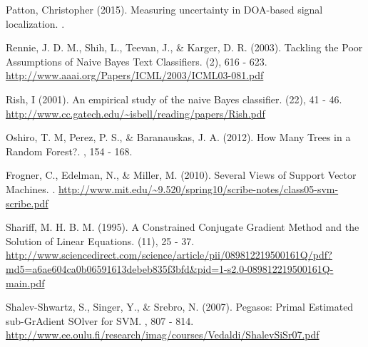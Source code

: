 \documentclass[twoside]{article}
\begin{document}
\begin{thebibliography}{99} %

Patton, Christopher (2015).
\newblock Measuring uncertainty in DOA-based signal localization.
.

Rennie, J. D. M., Shih, L., Teevan, J., \& Karger, D. R. (2003).
\newblock Tackling the Poor Assumptions of Naive Bayes Text Classifiers.
(2), 616 - 623. 
\url{http://www.aaai.org/Papers/ICML/2003/ICML03-081.pdf}
\href{http://www.aaai.org/Papers/ICML/2003/ICML03-081.pdf}{}
 
Rish, I (2001).
\newblock An empirical study of the naive Bayes classifier.
(22), 41 - 46. 
\url{http://www.cc.gatech.edu/~isbell/reading/papers/Rish.pdf}
\href{http://www.cc.gatech.edu/~isbell/reading/papers/Rish.pdf}{}

Oshiro, T. M, Perez, P. S., \& Baranauskas, J. A. (2012).
\newblock How Many Trees in a Random Forest?.
, 154 - 168. 

Frogner, C., Edelman, N., \& Miller, M. (2010).
\newblock Several Views of Support Vector Machines.
. 
\url{http://www.mit.edu/~9.520/spring10/scribe-notes/class05-svm-scribe.pdf}
\href{http://www.mit.edu/~9.520/spring10/scribe-notes/class05-svm-scribe.pdf}{}

Shariff, M. H. B. M. (1995).
\newblock A Constrained Conjugate Gradient Method and the Solution of Linear Equations.
(11), 25 - 37. 
\url{http://www.sciencedirect.com/science/article/pii/089812219500161Q/pdf?md5=a6ae604ca0b06591613debeb835f3bfd&pid=1-s2.0-089812219500161Q-main.pdf}
\href{http://www.sciencedirect.com/science/article/pii/089812219500161Q/pdf?md5=a6ae604ca0b06591613debeb835f3bfd&pid=1-s2.0-089812219500161Q-main.pdf}{}

 Shalev-Shwartz, S., Singer, Y., \& Srebro, N. (2007).
\newblock Pegasos: Primal Estimated sub-GrAdient SOlver for SVM.
, 807 - 814. 
\url{http://www.ee.oulu.fi/research/imag/courses/Vedaldi/ShalevSiSr07.pdf}
\href{http://www.ee.oulu.fi/research/imag/courses/Vedaldi/ShalevSiSr07.pdf}{}


\end{thebibliography}
\end{document}
